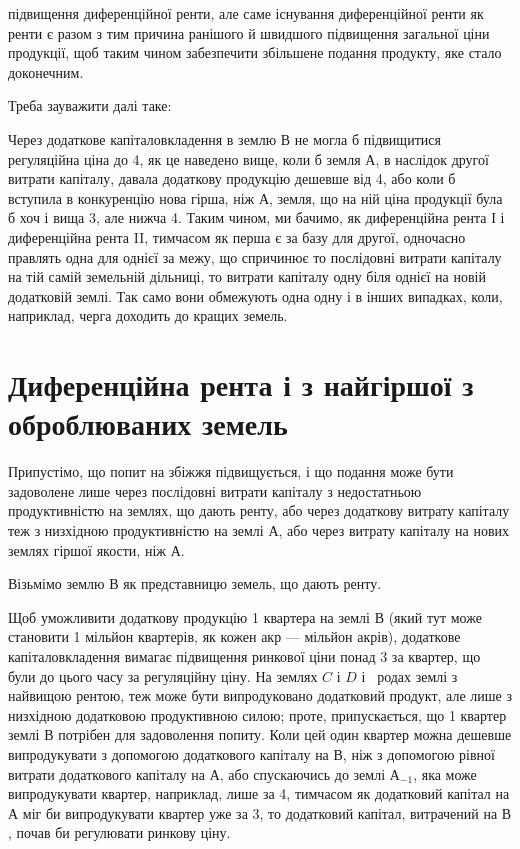 \parcont{}  %
підвищення диференційної ренти, але саме існування диференційної ренти як
ренти є разом з тим причина ранішого й швидшого підвищення загальної ціни
продукції, щоб таким чином забезпечити збільшене подання продукту, яке стало доконечним.

Треба зауважити далі таке:

Через додаткове капіталовкладення в землю $В$ не могла б підвищитися
регуляційна ціна до 4, як це наведено вище, коли б земля $А$, в наслідок
другої витрати капіталу, давала додаткову продукцію дешевше від 4, або коли б вступила в конкуренцію нова гірша, ніж $А$, земля, що на
ній ціна продукції була б хоч і вища 3, але нижча 4. Таким чином,
ми бачимо, як диференційна рента І і диференційна рента II, тимчасом як
перша є за базу для другої, одночасно правлять одна для однієї за межу, що
спричинює то послідовні витрати капіталу на тій самій земельній дільниці, то
витрати капіталу одну біля однієї на новій додатковій землі. Так само вони
обмежують одна одну і в інших випадках, коли, наприклад, черга доходить до
кращих земель.

\section{Диференційна рента і з найгіршої з оброблюваних земель}

Припустімо, що попит на збіжжя підвищується, і що подання може бути
задоволене лише через послідовні витрати капіталу з недостатньою продуктивністю
на землях, що дають ренту, або через додаткову витрату капіталу
теж з низхідною продуктивністю на землі $А$, або через витрату капіталу на
нових землях гіршої якости, ніж $А$.

Візьмімо землю $В$ як представницю земель, що дають ренту.

Щоб уможливити додаткову продукцію 1 квартера на землі $В$ (який
тут може становити 1 мільйон квартерів, як кожен акр — мільйон акрів), додаткове
капіталовкладення вимагає підвищення ринкової ціни понад 3
за квартер, що були до цього часу за регуляційну ціну. На землях $C$ і $D$ і~ родах землі з найвищою рентою, теж може бути випродуковано додатковий
продукт, але лише з низхідною додатковою продуктивною силою; проте,
припускається, що 1 квартер землі $В$ потрібен для задоволення попиту.
Коли цей один квартер можна дешевше випродукувати з допомогою додаткового
капіталу на $В$, ніж з допомогою рівної витрати додаткового капіталу
на $А$, або спускаючись до землі $А_{-1}$, яка може випродукувати квартер, наприклад,
лише за 4, тимчасом як додатковий капітал на $А$ міг би випродукувати
квартер уже за 3, то додатковий капітал, витрачений на
$В$, почав би регулювати ринкову ціну.

